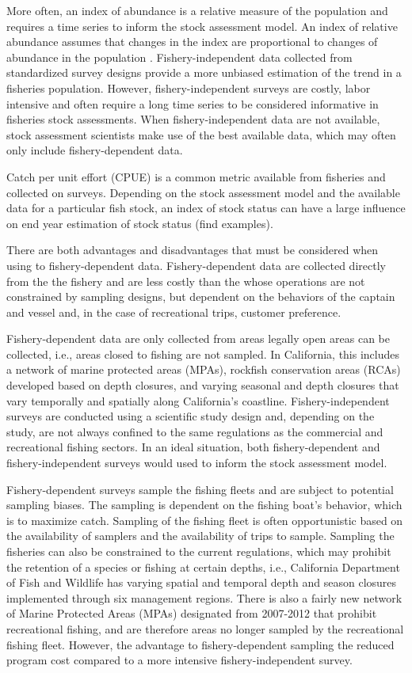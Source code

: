 \documentclass[
  authoryear,
  preprint,
  3p]{elsarticle}
\begin{document}
More often, an index of abundance is a relative measure of the
population and requires a time series to inform the stock assessment
model. An index of relative abundance assumes that changes in the index
are proportional to changes of abundance in the population
\citep{Harley:2001:CUE}. Fishery-independent data collected from
standardized survey designs provide a more unbiased estimation of the
trend in a fisheries population. However, fishery-independent surveys
are costly, labor intensive and often require a long time series to be
considered informative in fisheries stock assessments. When
fishery-independent data are not available, stock assessment scientists
make use of the best available data, which may often only include
fishery-dependent data.

Catch per unit effort (CPUE) is a common metric available from fisheries
and collected on surveys. Depending on the stock assessment model and
the available data for a particular fish stock, an index of stock status
can have a large influence on end year estimation of stock status (find
examples).

There are both advantages and disadvantages that must be considered when
using to fishery-dependent data. Fishery-dependent data are collected
directly from the the fishery and are less costly than the whose
operations are not constrained by sampling designs, but dependent on the
behaviors of the captain and vessel and, in the case of recreational
trips, customer preference.

Fishery-dependent data are only collected from areas legally open areas
can be collected, i.e., areas closed to fishing are not sampled. In
California, this includes a network of marine protected areas (MPAs),
rockfish conservation areas (RCAs) developed based on depth closures,
and varying seasonal and depth closures that vary temporally and
spatially along California's coastline. Fishery-independent surveys are
conducted using a scientific study design and, depending on the study,
are not always confined to the same regulations as the commercial and
recreational fishing sectors. In an ideal situation, both
fishery-dependent and fishery-independent surveys would used to inform
the stock assessment model.

Fishery-dependent surveys sample the fishing fleets and are subject to
potential sampling biases. The sampling is dependent on the fishing
boat's behavior, which is to maximize catch. Sampling of the fishing
fleet is often opportunistic based on the availability of samplers and
the availability of trips to sample. Sampling the fisheries can also be
constrained to the current regulations, which may prohibit the retention
of a species or fishing at certain depths, i.e., California Department
of Fish and Wildlife has varying spatial and temporal depth and season
closures implemented through six management regions. There is also a
fairly new network of Marine Protected Areas (MPAs) designated from
2007-2012 that prohibit recreational fishing, and are therefore areas no
longer sampled by the recreational fishing fleet. However, the advantage
to fishery-dependent sampling the reduced program cost compared to a
more intensive fishery-independent survey.
\end{document}
